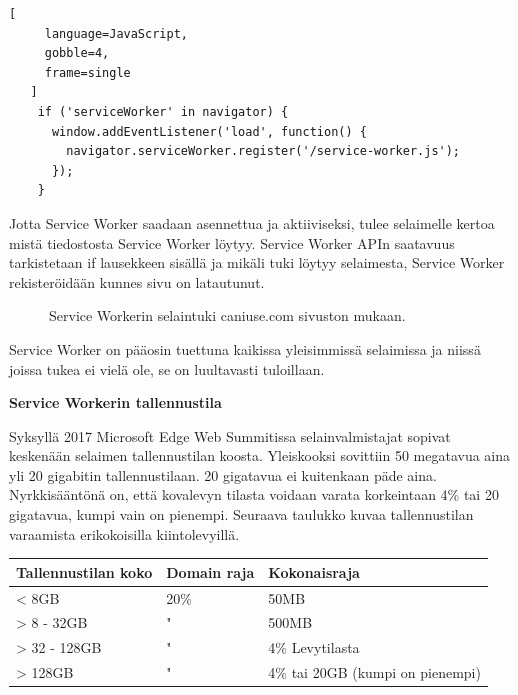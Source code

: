 \documentclass{tktltiki}
\begin{document}
\begin{lstlisting}[
     language=JavaScript,
     gobble=4,
     frame=single
   ]
    if ('serviceWorker' in navigator) {
      window.addEventListener('load', function() {
        navigator.serviceWorker.register('/service-worker.js');
      });
    }
\end{lstlisting}

Jotta Service Worker saadaan asennettua ja aktiiviseksi, tulee selaimelle kertoa mistä tiedostosta Service Worker löytyy. Service Worker APIn saatavuus tarkistetaan if lausekkeen sisällä ja mikäli tuki löytyy selaimesta, Service Worker rekisteröidään kunnes sivu on latautunut. 

\begin{figure}[h]
\begin{center}
\caption{Service Workerin selaintuki caniuse.com sivuston mukaan. }
\label{Service workerin selaintuki}
\end{center}
\end{figure}

Service Worker on pääosin tuettuna kaikissa yleisimmissä selaimissa ja niissä joissa tukea ei vielä ole, se on luultavasti tuloillaan.

\textbf{Service Workerin tallennustila}

Syksyllä 2017 Microsoft Edge Web Summitissa selainvalmistajat sopivat keskenään selaimen tallennustilan koosta. \cite{Love} Yleiskooksi sovittiin 50 megatavua aina yli 20 gigabitin tallennustilaan. 20 gigatavua ei kuitenkaan päde aina. Nyrkkisääntönä on, että kovalevyn tilasta voidaan varata korkeintaan 4\% tai 20 gigatavua, kumpi vain on pienempi. Seuraava taulukko kuvaa tallennustilan varaamista erikokoisilla kiintolevyillä.

\begin{table}[!ht]
\begin{center}
  \begin{tabular}{|L{5cm}|L{5cm}|L{5cm}|}
    \hline
    \textbf{Tallennustilan koko} & 
    \textbf{Domain raja} &
    \textbf{Kokonaisraja}
    \\ \hline
    < 8GB & 20\% & 50MB \\ \hline
    > 8 - 32GB & " & 500MB \\ \hline
    > 32 - 128GB & " & 4\% Levytilasta \\ \hline
    > 128GB & " & 4\% tai 20GB (kumpi on pienempi) \\
    \hline
  \end{tabular}
\end{center}
\label{table:selaimentallennustila}
\end{table}
\end{document}
